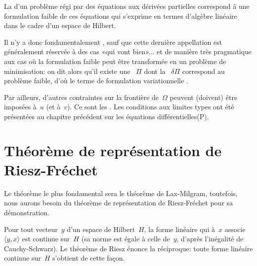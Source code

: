 \medskip
La  d'un problème régi par des équations aux dérivées partielles correspond
à une formulation faible de ces équations qui s'exprime en termes d'algèbre linéaire dans
le cadre d'un espace de Hilbert.

Il n'y a donc fondamentalement , sauf que cette dernière appellation est généralement réservée à
des cas «qui vont bien»... et de manière très pragmatique aux cas où
la formulation faible peut être transformée en un problème de minimisation:
on dit alors qu'il existe une ~$\Pi$ dont la
~$\delta\Pi$ correspond au problème faible, d'où
le terme de formulation variationnelle .

\medskip
Par ailleurs, d'autres contraintes sur la frontière de~$\Omega$ peuvent (doivent) être
imposées à~$u$ (et à~$v$). Ce sont les .
Les conditions aux limites types ont été présentées au chapitre précédent
sur les équations différentielles(P).

\medskip
\section{Théorème de représentation de Riesz-Fréchet}
Le théorème le plus fondamental sera le théorème de Lax-Milgram, toutefois,
nous aurons besoin du théorème de représentation de Riesz-Fréchet pour sa démonstration.

\medskip
Pour tout vecteur~$y$ d'un espace de Hilbert~$H$, la forme linéaire qui à~$x$ associe~$\langle y,x\rangle$
est continue sur~$H$ (sa norme est égale à celle de~$y$, d'après l'inégalité de Cauchy-Schwarz).
Le théorème de Riesz énonce la réciproque: toute forme linéaire continue sur~$H$ s'obtient de cette
façon.

